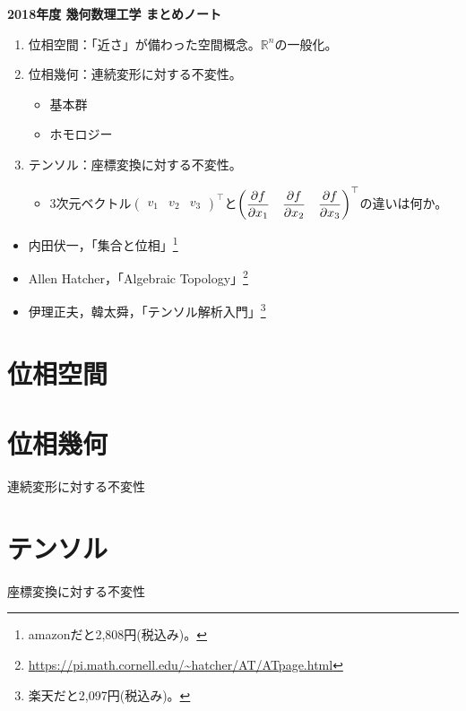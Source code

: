\documentclass[uplatex]{jsarticle}
\newcommand{\octopuspart}[1]{\newpage\part{#1}\setcounter{section}{0}\vspace{3\baselineskip}}
\begin{document}
\begin{center}{\LARGE \bf 2018年度 幾何数理工学 まとめノート}\end{center}

\sukima {}
\begin{enumerate}
    \vspace{-0.5\baselineskip}
    \item 位相空間：「近さ」が備わった空間概念。$\mathbb{R}^{n}$の一般化。
    \item 位相幾何：連続変形に対する不変性。
    \begin{itemize}
        \item 基本群
        \item ホモロジー
    \end{itemize}
    \item テンソル：座標変換に対する不変性。
    \begin{itemize}
        \item 3次元ベクトル${\displaystyle \begin{pmatrix}
            v_{1} & v_{2} & v_{3} 
        \end{pmatrix}^{\top}}$と${\displaystyle \begin{pmatrix}
            \dfrac{\partial f}{\partial x_{1}} & \dfrac{\partial f}{\partial x_{2}} & \dfrac{\partial f}{\partial x_{3}}
        \end{pmatrix}^{\top}}$の違いは何か。
    \end{itemize}
\end{enumerate}

\begin{itemize}
    \vspace{-0.5\baselineskip}
    \item 内田伏一，「集合と位相」\footnote{amazonだと2,808円(税込み)。}
    \item Allen Hatcher，「Algebraic Topology」\footnote{\url{https://pi.math.cornell.edu/~hatcher/AT/ATpage.html}}
    \item 伊理正夫，韓太舜，「テンソル解析入門」\footnote{楽天だと2,097円(税込み)。}
\end{itemize}

\renewcommand{\baselinestretch}{0.1}
\tableofcontents
\renewcommand{\baselinestretch}{1.0}

\octopuspart{位相空間}

\octopuspart{位相幾何}
連続変形に対する不変性


\octopuspart{テンソル}
座標変換に対する不変性

\end{document}

